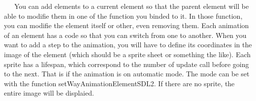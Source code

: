 ~~~You can add elements to a current element so that the parent element will be able to modifie them in one of the function you binded to it. In those function, you can modifie the element itself or other, even removing them. Each animation of an element has a code so that you can switch from one to another. When you want to add a step to the animation, you will have to define its coordinates in the image of the element (which should be a sprite sheet or something the like). Each sprite has a lifespan, which correspond to the number of update call before going to the next. That is if the animation is on \textquotesingle{}automatic\textquotesingle{} mode. The mode can be set with the function set\+Way\+Animation\+Element\+S\+D\+L2. If there are no sprite, the entire image will be displaied. ~\newline
~\newline
 